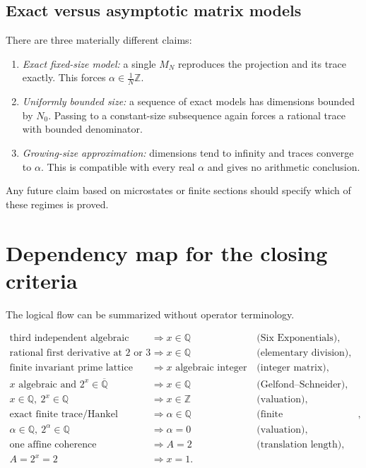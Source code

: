 \documentclass[11pt,oneside]{article}
\theoremstyle{definition}
\theoremstyle{remark}
\newcommand{\Z}{\mathbb Z}
\newcommand{\Q}{\mathbb Q}
\newcommand{\Alg}{\overline{\mathbb Q}}
\begin{document}
\subsection{Exact versus asymptotic matrix models}

There are three materially different claims:

\begin{enumerate}
\item \emph{Exact fixed-size model:} a single \(M_N\) reproduces the
      projection and its trace exactly.  This forces
      \(\alpha\in\frac1N\Z\).
\item \emph{Uniformly bounded size:} a sequence of exact models has
      dimensions bounded by \(N_0\).  Passing to a constant-size
      subsequence again forces a rational trace with bounded
      denominator.
\item \emph{Growing-size approximation:} dimensions tend to infinity
      and traces converge to \(\alpha\).  This is compatible with every
      real \(\alpha\) and gives no arithmetic conclusion.
\end{enumerate}

Any future claim based on microstates or finite sections should specify
which of these regimes is proved.

\section{Dependency map for the closing criteria}

The logical flow can be summarized without operator terminology.

\begin{align*}
\text{third independent algebraic mode}
&\Longrightarrow x\in\Q
 &&\text{(Six Exponentials)},\\
\text{rational first derivative at \(2\) or \(3\)}
&\Longrightarrow x\in\Q
 &&\text{(elementary division)},\\
\text{finite invariant prime lattice}
&\Longrightarrow x\text{ algebraic integer}
 &&\text{(integer matrix)},\\
x\text{ algebraic and }2^x\in\Alg
&\Longrightarrow x\in\Q
 &&\text{(Gelfond--Schneider)},\\
x\in\Q,\ 2^x\in\Q
&\Longrightarrow x\in\Z
 &&\text{(valuation)},\\
\text{exact finite trace/Hankel model}
&\Longrightarrow\alpha\in\Q
 &&\text{(finite rank/periodicity)},\\
\alpha\in\Q,\ 2^\alpha\in\Q
&\Longrightarrow\alpha=0
 &&\text{(valuation)},\\
\text{one affine coherence}
&\Longrightarrow A=2
 &&\text{(translation length)},\\
A=2^x=2
&\Longrightarrow x=1.
\end{align*}
\end{document}
